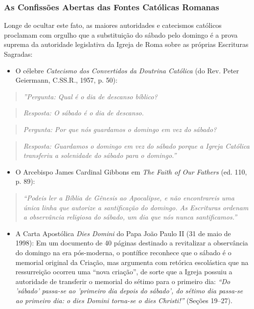 \subsubsection*{As Confissões Abertas das Fontes Católicas Romanas}
Longe de ocultar este fato, as maiores autoridades e catecismos católicos proclamam com orgulho que a substituição do sábado pelo domingo é a prova suprema da autoridade legislativa da Igreja de Roma sobre as próprias Escrituras Sagradas:
\begin{itemize}
  \item O célebre \textit{Catecismo dos Convertidos da Doutrina Católica} (do Rev. Peter Geiermann, C.SS.R., 1957, p. 50):
\end{itemize}


\begin{quote}
\itshape ''Pergunta: Qual é o dia de descanso bíblico?
\end{quote}


\begin{quote}
\itshape Resposta: O sábado é o dia de descanso.
\end{quote}


\begin{quote}
\itshape Pergunta: Por que nós guardamos o domingo em vez do sábado?
\end{quote}


\begin{quote}
\itshape Resposta: Guardamos o domingo em vez do sábado porque a Igreja Católica transferiu a solenidade do sábado para o domingo.''
\end{quote}

\begin{itemize}
  \item O Arcebispo James Cardinal Gibbons em \textit{The Faith of Our Fathers} (ed. 110, p. 89):
\end{itemize}


\begin{quote}
\itshape ``Podeis ler a Bíblia de Gênesis ao Apocalipse, e não encontrareis uma única linha que autorize a santificação do domingo. As Escrituras ordenam a observância religiosa do sábado, um dia que nós nunca santificamos.''
\end{quote}

\begin{itemize}
  \item A Carta Apostólica \textit{Dies Domini} do Papa João Paulo II (31 de maio de 1998): Em um documento de 40 páginas destinado a revitalizar a observância do domingo na era pós-moderna, o pontífice reconhece que o sábado é o memorial original da Criação, mas argumenta com retórica escolástica que na ressurreição ocorreu uma ``nova criação'', de sorte que a Igreja possuiu a autoridade de transferir o memorial do sétimo para o primeiro dia: \textit{``Do 'sábado' passa-se ao 'primeiro dia depois do sábado', do sétimo dia passa-se ao primeiro dia: o dies Domini torna-se o dies Christi!''} (Seções 19–27).
\end{itemize}


